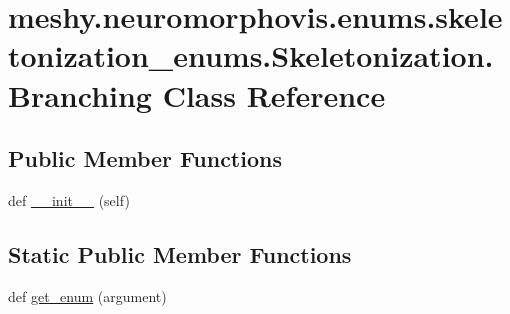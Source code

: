 \hypertarget{classmeshy_1_1neuromorphovis_1_1enums_1_1skeletonization__enums_1_1Skeletonization_1_1Branching}{}\section{meshy.\+neuromorphovis.\+enums.\+skeletonization\+\_\+enums.\+Skeletonization.\+Branching Class Reference}
\label{classmeshy_1_1neuromorphovis_1_1enums_1_1skeletonization__enums_1_1Skeletonization_1_1Branching}


 


\subsection*{Public Member Functions}
\begin{DoxyCompactItemize}
\item 
def \hyperlink{classmeshy_1_1neuromorphovis_1_1enums_1_1skeletonization__enums_1_1Skeletonization_1_1Branching_ac23ad2a93bdb0a5a70e895dbfab97def}{\+\_\+\+\_\+init\+\_\+\+\_\+} (self)\hypertarget{classmeshy_1_1neuromorphovis_1_1enums_1_1skeletonization__enums_1_1Skeletonization_1_1Branching_ac23ad2a93bdb0a5a70e895dbfab97def}{}\label{classmeshy_1_1neuromorphovis_1_1enums_1_1skeletonization__enums_1_1Skeletonization_1_1Branching_ac23ad2a93bdb0a5a70e895dbfab97def}

\end{DoxyCompactItemize}
\subsection*{Static Public Member Functions}
\begin{DoxyCompactItemize}
\item 
def \hyperlink{classmeshy_1_1neuromorphovis_1_1enums_1_1skeletonization__enums_1_1Skeletonization_1_1Branching_af45e6f3c9510dc94168e2372d888b5c8}{get\+\_\+enum} (argument)\hypertarget{classmeshy_1_1neuromorphovis_1_1enums_1_1skeletonization__enums_1_1Skeletonization_1_1Branching_af45e6f3c9510dc94168e2372d888b5c8}{}\label{classmeshy_1_1neuromorphovis_1_1enums_1_1skeletonization__enums_1_1Skeletonization_1_1Branching_af45e6f3c9510dc94168e2372d888b5c8}

\end{DoxyCompactItemize}
